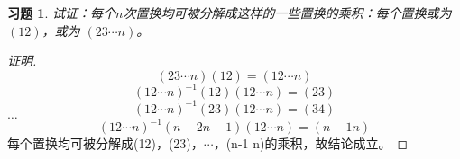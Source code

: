 \documentclass{article}
\begin{document}
\begin{CJK}{UTF8}{gbsn}
\newtheorem*{Ex}{习题}
  \begin{Ex}
  试证：每个$n$次置换均可被分解成这样的一些置换的乘积：每个置换或为$(12)$，或为
  $(23\cdots n)$。  
  \end{Ex}
  \begin{proof}[证明]
    \[(23\cdots n)(12) = (12\cdots n)\]
    \[(12\cdots n)^{-1}(12)(12\cdots n) = (23)\]
    \[(12\cdots n)^{-1}(23)(12\cdots n) = (34)\]
    $\ldots$
    \[(12\cdots n)^{-1}(n-2 n-1)(12\cdots n) = (n-1 n)\]
    每个置换均可被分解成(12)，(23)，$\cdots$，(n-1 n)的乘积，故结论成立。
  \end{proof}
\end{CJK}
\end{document}
